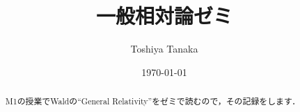 \documentclass[english, dvipdfmx, a4paper]{jsarticle}
\title{一般相対論ゼミ}
\author{Toshiya Tanaka}
\date{\today}
\theoremstyle{break}
\numberwithin{equation}{section}
\begin{document}
	\maketitle
	\begin{abstract}
		M1の授業でWaldの``General Relativity''をゼミで読むので，その記録をします．
	\end{abstract}
	
	
%	
%	
\end{document}
